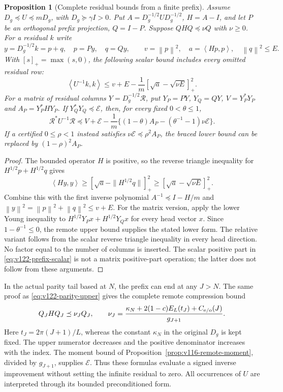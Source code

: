 \documentclass[11pt]{article}
\newtheorem{proposition}[theorem]{Proposition}
\theoremstyle{remark}
\newcommand{\norm}[1]{\left\lVert #1\right\rVert}
\newcommand{\ip}[2]{\left\langle #1,#2\right\rangle}
\begin{document}
\begin{proposition}[Complete residual bounds from a finite prefix]
\label{prop:v122-prefix-refinement}
Assume $D_g\preceq U\preceq mD_g$, with
$D_g\succeq\gamma I>0$. Put
$A=D_g^{-1/2}UD_g^{-1/2}$, $H=A-I$, and let $P$ be an
orthogonal prefix projection, $Q=I-P$. Suppose
$QHQ\preceq\nu Q$ with $\nu\ge0$. For a residual $k$ write
\[
 y=D_g^{-1/2}k=p+q,\quad p=Py,\quad q=Qy,\qquad
 v=\norm p^2,\quad a=\ip{Hp}{p},\quad \norm q^2\le E.
\]
With $[s]_+=\max(s,0)$, the following scalar bound includes
every omitted residual row:
\begin{equation}\label{eq:v122-prefix-scalar}
 \ip{U^{-1}k}{k}
 \le v+E-\frac1m[\sqrt a-\sqrt{\nu E}]_+^2.
\end{equation}
For a matrix of residual columns $Y=D_g^{-1/2}\mathcal R$, put
$Y_P=PY$, $Y_Q=QY$, $V=Y_P^*Y_P$ and
$A_P=Y_P^*HY_P$. If $Y_Q^*Y_Q\preceq\mathcal E$, then, for
every fixed $0<\theta\le1$,
\begin{equation}\label{eq:v122-prefix-matrix}
 \mathcal R^*U^{-1}\mathcal R\preceq
 V+\mathcal E-\frac1m
 \{(1-\theta)A_P-(\theta^{-1}-1)\nu\mathcal E\}.
\end{equation}
If a certified $0\le\rho<1$ instead satisfies
$\nu\mathcal E\preceq\rho^2A_P$, the braced lower bound can
be replaced by $(1-\rho)^2A_P$.
\end{proposition}
\begin{proof}
The bounded operator $H$ is positive, so the reverse triangle
inequality for $H^{1/2}p+H^{1/2}q$ gives
\[
 \ip{Hy}{y}\ge
 [\sqrt a-\|H^{1/2}q\|]_+^2
 \ge[\sqrt a-\sqrt{\nu E}]_+^2.
\]
Combine this with the first inverse polynomial
$A^{-1}\preceq I-H/m$ and
$\norm y^2=\norm p^2+\norm q^2\le v+E$.
For the matrix version, apply the lower Young inequality to
$H^{1/2}Y_Px+H^{1/2}Y_Qx$ for every head vector $x$.
Since $1-\theta^{-1}\le0$, the remote upper bound supplies the
stated lower form. The relative variant follows from the scalar
reverse triangle inequality in every head direction. No factor
equal to the number of columns is inserted. The scalar positive
part in \eqref{eq:v122-prefix-scalar} is not a matrix positive-part
operation; the latter does not follow from these arguments.
\end{proof}

In the actual parity tail based at $N$, the prefix can end at any
$J>N$. The same proof as \eqref{eq:v122-parity-upper} gives the
complete remote compression bound
\begin{equation}\label{eq:v122-remote-H}
 Q_JHQ_J\preceq\nu_J Q_J,\qquad
 \nu_J=\frac{\kappa_N+2(1-c)E_L(t_J)+C_{\rm e/o}(J)}{g_{J+1}}.
\end{equation}
Here $t_J=2\pi(J+1)/L$, whereas the constant $\kappa_N$ in
the original $D_g$ is kept fixed. The upper numerator decreases
and the positive denominator increases with the index. The moment
bound of Proposition~\ref{prop:v116-remote-moment}, divided by
$g_{J+1}$, supplies $\mathcal E$. Thus these formulas evaluate a
signed inverse improvement without setting the infinite residual
to zero. All occurrences of $U$ are interpreted through its
bounded preconditioned form.
\end{document}
